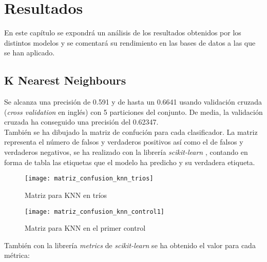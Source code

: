 
\chapter{Resultados}
En este capítulo se expondrá un análisis de los resultados obtenidos por los distintos modelos y se comentará su rendimiento en las bases de datos a las que se han aplicado.

\section{K Nearest Neighbours}
Se alcanza una precisión de 0.591 y de hasta un 0.6641 usando validación cruzada (\textit{cross validation} en inglés) con 5 particiones del conjunto. De media, la validación cruzada ha conseguido una precisión del 0.62347.\\
También se ha dibujado \cite{Hunter:2007} la matriz de confución para cada clasificador. La matriz representa el número de falsos y verdaderos positivos así como el de falsos y verdaderos negativos, se ha realizado con la librería \textit{scikit-learn} \cite{scikit2021metrics}, contando en forma de tabla las etiquetas que el modelo ha predicho y su verdadera etiqueta.

\begin{figure}[H]
\centering
\begin{minipage}[t]{.5\textwidth}
  \texttt{[image: matriz\_confusion\_knn\_trios]}
  \caption{Matriz para KNN en tríos}
  \label{fig:confusion-knn-trios}
\end{minipage}%
\begin{minipage}[t]{.5\textwidth}
  \texttt{[image: matriz\_confusion\_knn\_control1]}
  \caption{Matriz para KNN en el primer control}
  \label{fig:confusion-knn-control1}
\end{minipage}
\end{figure}

También con la librería \textit{metrics} de \textit{scikit-learn} se ha obtenido el valor para cada métrica:

